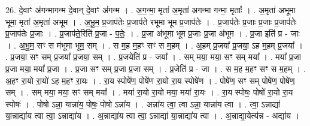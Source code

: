 \documentclass[17pt]{extarticle}
\begin{document}
26. दे॒वाꣳ अ॑गन्मागन्म दे॒वान् दे॒वाꣳ अ॑गन्म । . अ॒ग॒न्मा॒ मृता॑ अ॒मृता॑ अगन्मा गन्मा॒ मृताः᳚ । . अ॒मृता॑ अभूमा भूमा॒ मृता॑ अ॒मृता॑ अभूम । . अ॒भू॒म॒ प्र॒जाप॑तेः प्र॒जाप॑ते रभूमा भूम प्र॒जाप॑तेः । . प्र॒जाप॑तेः प्र॒जाः प्र॒जाः प्र॒जाप॑तेः प्र॒जाप॑तेः प्र॒जाः । . प्र॒जाप॑ते॒रिति॑ प्र॒जा - प॒तेः॒ । . प्र॒जा अ॑भूमा भूम प्र॒जाः प्र॒जा अ॑भूम । . प्र॒जा इति॑ प्र - जाः । . अ॒भू॒म॒ सꣳ स म॑भूमा भूम॒ सम् । . स म॒ह म॒हꣳ सꣳ स म॒हम् । . अ॒हम् प्र॒जया᳚ प्र॒जया॒ ऽह म॒हम् प्र॒जया᳚ । . प्र॒जया॒ सꣳ सम् प्र॒जया᳚ प्र॒जया॒ सम् । . प्र॒जयेति॑ प्र - जया᳚ । . सम् मया॒ मया॒ सꣳ सम् मया᳚ । . मया᳚ प्र॒जा प्र॒जा मया॒ मया᳚ प्र॒जा । . प्र॒जा सꣳ सम् प्र॒जा प्र॒जा सम् । . प्र॒जेति॑ प्र - जा । . स म॒ह म॒हꣳ सꣳ स म॒हम् । . अ॒हꣳ रा॒यो रा॒यो॑ ऽह म॒हꣳ रा॒यः । . रा॒य स्पोषे॑ण॒ पोषे॑ण रा॒यो रा॒य स्पोषे॑ण । . पोषे॑ण॒ सꣳ सम् पोषे॑ण॒ पोषे॑ण॒ सम् । . सम् मया॒ मया॒ सꣳ सम् मया᳚ । . मया॑ रा॒यो रा॒यो मया॒ मया॑ रा॒यः । . रा॒य स्पोषः॒ पोषो॑ रा॒यो रा॒य स्पोषः॑ । . पोषो ऽन्ना॒ यान्ना॑य॒ पोषः॒ पोषो ऽन्ना॑य । . अन्ना॑य त्वा॒ त्वा ऽन्ना॒ यान्ना॑य त्वा । . त्वा॒ ऽन्नाद्या॑ या॒न्नाद्या॑य त्वा त्वा॒ ऽन्नाद्या॑य । . अ॒न्नाद्या॑य त्वा त्वा॒ ऽन्नाद्या॑ या॒न्नाद्या॑य त्वा । . अ॒न्नाद्या॒येत्य॑न्न - अद्या॑य । \newline
\end{document}
